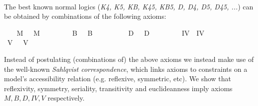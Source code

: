 \begin{isabellebody}
%
\ %
%
\isamarkupfalse%
\ \ \ %
%
%
%
%
\isamarkuptrue%
%
\begin{isamarkuptext}%
The best known normal logics (\emph{K4, K5, KB, K45, KB5, D, D4, D5, D45, ...}) can be obtained by
 combinations of the following axioms:%
\end{isamarkuptext}\isamarkuptrue%
\ \ \isamarkupfalse%
\ M\ \ \ {\isachardoublequoteopen}M\ {\isasymequiv}\ \isactrlbold {\isasymforall}{\isasymphi}{\isachardot}\ \isactrlbold {\isasymbox}{\isasymphi}\ \isactrlbold {\isasymrightarrow}\ {\isasymphi}{\isachardoublequoteclose}\isanewline
\ \ \isamarkupfalse%
\ B\ \ \ {\isachardoublequoteopen}B\ {\isasymequiv}\ \isactrlbold {\isasymforall}{\isasymphi}{\isachardot}\ {\isasymphi}\ \isactrlbold {\isasymrightarrow}\ \ \isactrlbold {\isasymbox}\isactrlbold {\isasymdiamond}{\isasymphi}{\isachardoublequoteclose}\isanewline
\ \ \isamarkupfalse%
\ D\ \ \ {\isachardoublequoteopen}D\ {\isasymequiv}\ \isactrlbold {\isasymforall}{\isasymphi}{\isachardot}\ \isactrlbold {\isasymbox}{\isasymphi}\ \isactrlbold {\isasymrightarrow}\ \isactrlbold {\isasymdiamond}{\isasymphi}{\isachardoublequoteclose}\isanewline
\ \ \isamarkupfalse%
\ IV\ \ {\isachardoublequoteopen}IV\ {\isasymequiv}\ \isactrlbold {\isasymforall}{\isasymphi}{\isachardot}\ \isactrlbold {\isasymbox}{\isasymphi}\ \isactrlbold {\isasymrightarrow}\ \ \isactrlbold {\isasymbox}\isactrlbold {\isasymbox}{\isasymphi}{\isachardoublequoteclose}\isanewline
\ \ \isamarkupfalse%
\ V\ \ \ {\isachardoublequoteopen}V\ {\isasymequiv}\ \isactrlbold {\isasymforall}{\isasymphi}{\isachardot}\ \isactrlbold {\isasymdiamond}{\isasymphi}\ \isactrlbold {\isasymrightarrow}\ \isactrlbold {\isasymbox}\isactrlbold {\isasymdiamond}{\isasymphi}{\isachardoublequoteclose}%
\begin{isamarkuptext}%
Instead of postulating (combinations of) the above  axioms we instead make use of 
  the well-known \emph{Sahlqvist correspondence}, which links axioms to constraints on a model's accessibility
  relation (e.g. reflexive, symmetric, etc). We show  that  reflexivity, symmetry, seriality, transitivity and euclideanness imply
  axioms $M, B, D, IV, V$ respectively.%
\end{isamarkuptext}\isamarkuptrue%

\end{isabellebody}
